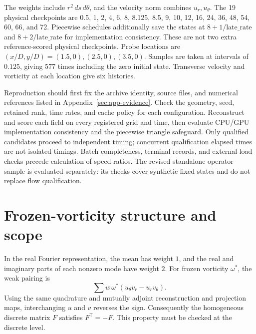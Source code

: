 The weights include $r^2\,ds\,d\theta$, and the velocity norm combines $u_r,u_\theta$. The 19 physical checkpoints are 0.5, 1, 2, 4, 6, 8, 8.125, 8.5, 9, 10, 12, 16, 24, 36, 48, 54, 60, 66, and 72. Piecewise schedules additionally save the states at $8+1/\mathrm{late\_rate}$ and $8+2/\mathrm{late\_rate}$ for implementation consistency. These are not two extra reference-scored physical checkpoints. Probe locations are $(x/D,y/D)=(1.5,0),(2.5,0),(3.5,0)$. Samples are taken at intervals of $0.125$, giving 577 times including the zero initial state. Transverse velocity and vorticity at each location give six histories.

Reproduction should first fix the archive identity, source files, and numerical references listed in Appendix~\ref{sec:app-evidence}. Check the geometry, seed, retained rank, time rates, and cache policy for each configuration. Reconstruct and score each field on every registered grid and time, then evaluate CPU/GPU implementation consistency and the piecewise triangle safeguard. Only qualified candidates proceed to independent timing; concurrent qualification elapsed times are not isolated timings. Batch completeness, terminal records, and external-load checks precede calculation of speed ratios. The revised standalone operator sample is evaluated separately: its checks cover synthetic fixed states and do not replace flow qualification.

\section{Frozen-vorticity structure and scope}
\label{sec:app-lamb}
\setcounter{equation}{0}
\renewcommand{\theequation}{B.\arabic{equation}}
\renewcommand{\theHequation}{appendix.B.\arabic{equation}}

In the real Fourier representation, the mean has weight \(1\), and the
real and imaginary parts of each nonzero mode have weight \(2\). For
frozen vorticity \(\omega^\ast\), the weak pairing is
\[
 \sum w\,\omega^\ast(u_\theta v_r-u_rv_\theta).
\]
Using the same quadrature and mutually adjoint reconstruction and
projection maps, interchanging \(u\) and \(v\) reverses the sign.
Consequently the homogeneous discrete matrix \(F\) satisfies
\(F^{\mathsf T}=-F\). This property must be checked at the discrete level.

